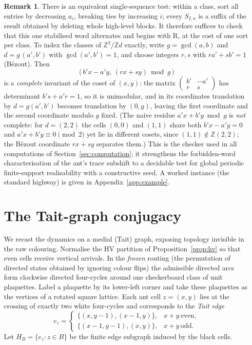 \documentclass[11pt,reqno]{amsart}
\theoremstyle{plain}
\theoremstyle{definition}
\newtheorem{remark}[theorem]{Remark}
\newcommand{\Z}{\mathbb{Z}}
\newcommand{\drift}{d}
\newcommand{\turnR}{\mathrm{R}}
\begin{document}
\begin{remark}\label{rem:onesort}
There is an equivalent single-sequence test: within a class, sort all entries by
decreasing $a_i$, breaking ties by increasing $i$; every $S_{I,n}$ is a suffix of the
result obtained by deleting whole high-level blocks. It therefore suffices to check
that this one stabilised word alternates and begins with $\turnR$, at the cost of one
sort per class. To index the classes of $\Z^2/\Z\drift$ exactly, write
$g=\gcd(a,b)$ and $\drift=g\,(a',b')$ with $\gcd(a',b')=1$, and choose integers $r,s$
with $r a'+s b'=1$ (B\'ezout). Then
\[
\bigl(\,b'x-a'y,\ (r x+s y)\bmod g\,\bigr)
\]
is a \emph{complete} invariant of the coset of $(x,y)$: the matrix
$\left(\begin{smallmatrix} b'&-a'\\ r&s\end{smallmatrix}\right)$ has determinant
$b's+a'r=1$, so it is unimodular, and in its coordinates translation by
$\drift=g(a',b')$ becomes translation by $(0,g)$, leaving the first coordinate and the
second coordinate modulo $g$ fixed. (The naive residue $a'x+b'y\bmod g$ is
\emph{not} complete: for $\drift=(2,2)$ the cells $(0,0)$ and $(1,1)$ share both
$b'x-a'y=0$ and $a'x+b'y\equiv0\pmod2$ yet lie in different cosets, since
$(1,1)\notin\Z(2,2)$; the B\'ezout coordinate $rx+sy$ separates them.) This is the
checker used in all computations
of Section~\ref{sec:computation}; it strengthens the
forbidden-word characterisation of the ant's trace subshift
\cite{Gajardo2003symbolic} to a decidable test for global periodic finite-support
realisability with a constructive seed. A worked instance (the standard highway) is
given in Appendix~\ref{app:example}.
\end{remark}

\section{The Tait-graph conjugacy}\label{sec:tait}

We recast the dynamics on a medial (Tait) graph, exposing topology invisible in the
raw colouring. Normalise the HV partition of Proposition~\ref{prop:hv} so that
even cells receive vertical arrivals. In the \emph{frozen} routing (the permutation
of directed states obtained by ignoring colour flips) the admissible directed arcs
form clockwise directed four-cycles around one checkerboard class of unit plaquettes.
Label a plaquette by its lower-left corner and take these plaquettes as the vertices
of a rotated square lattice. Each ant cell $z=(x,y)$ lies at the crossing of exactly
two white four-cycles and corresponds to the \emph{Tait edge}
\begin{equation}\label{eq:tait}
e_z=\begin{cases}\{(x,y-1),(x-1,y)\}, & x+y\ \text{even},\\[2pt]
\{(x-1,y-1),(x,y)\}, & x+y\ \text{odd}.\end{cases}
\end{equation}
Let $H_B=\{e_z:z\in B\}$ be the finite edge subgraph induced by the black cells.
\end{document}
